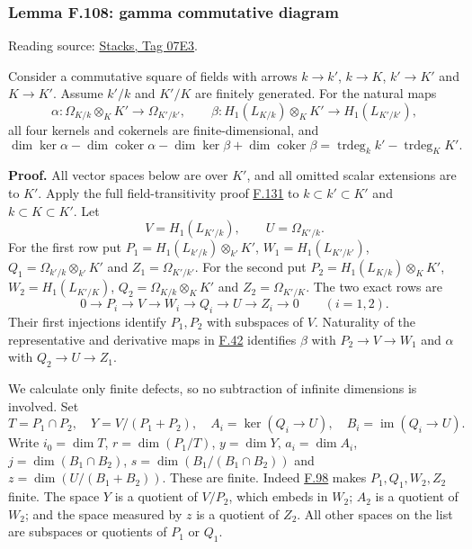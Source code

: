 \documentclass[11pt,a4paper,openany]{report}
\begin{document}
\label{AG-RG-S05-more-algebra-lemma-gamma-commutative-diagram}

\subsubsection{Lemma F.108: gamma commutative diagram}\label{AG-RG-S05-lemma-f.108-gamma-commutative-diagram}

Reading source: \href{https://stacks.math.columbia.edu/tag/07E3}{Stacks, Tag 07E3}.

Consider a commutative square of fields with arrows \(k\to k'\), \(k\to K\), \(k'\to K'\) and \(K\to K'\). Assume \(k'/k\) and \(K'/K\) are finitely generated. For the natural maps \[
\alpha:\Omega_{K/k}\otimes_KK'\longrightarrow\Omega_{K'/k'},
\qquad
\beta:H_1(L_{K/k})\otimes_KK'\longrightarrow H_1(L_{K'/k'}),
\] all four kernels and cokernels are finite-dimensional, and \[
\dim\ker\alpha-\dim\operatorname{coker}\alpha
-\dim\ker\beta+\dim\operatorname{coker}\beta
=\operatorname{trdeg}_k k'-\operatorname{trdeg}_K K'.
\]

\textbf{Proof.} All vector spaces below are over \(K'\), and all omitted scalar extensions are to \(K'\). Apply the full field-transitivity proof \hyperref[AG-RG-S05-more-algebra-lemma-transitivity-gamma]{F.131} to \(k\subset k'\subset K'\) and \(k\subset K\subset K'\). Let \[
V=H_1(L_{K'/k}),\qquad U=\Omega_{K'/k}.
\] For the first row put \(P_1=H_1(L_{k'/k})\otimes_{k'}K'\), \(W_1=H_1(L_{K'/k'})\), \(Q_1=\Omega_{k'/k}\otimes_{k'}K'\) and \(Z_1=\Omega_{K'/k'}\). For the second put \(P_2=H_1(L_{K/k})\otimes_KK'\), \(W_2=H_1(L_{K'/K})\), \(Q_2=\Omega_{K/k}\otimes_KK'\) and \(Z_2=\Omega_{K'/K}\). The two exact rows are \[
0\longrightarrow P_i\longrightarrow V\longrightarrow W_i
\longrightarrow Q_i\longrightarrow U\longrightarrow Z_i\longrightarrow0
\qquad(i=1,2).
\] Their first injections identify \(P_1,P_2\) with subspaces of \(V\). Naturality of the representative and derivative maps in \hyperref[AG-RG-S05-algebra-lemma-exact-sequence-NL]{F.42} identifies \(\beta\) with \(P_2\to V\to W_1\) and \(\alpha\) with \(Q_2\to U\to Z_1\).

We calculate only finite defects, so no subtraction of infinite dimensions is involved. Set \[
T=P_1\cap P_2,\quad Y=V/(P_1+P_2),\quad
A_i=\ker(Q_i\to U),\quad B_i=\operatorname{im}(Q_i\to U).
\] Write \(i_0=\dim T\), \(r=\dim(P_1/T)\), \(y=\dim Y\), \(a_i=\dim A_i\), \(j=\dim(B_1\cap B_2)\), \(s=\dim(B_1/(B_1\cap B_2))\) and \(z=\dim(U/(B_1+B_2))\). These are finite. Indeed \hyperref[AG-RG-S05-more-algebra-lemma-cartier-equality]{F.98} makes \(P_1,Q_1,W_2,Z_2\) finite. The space \(Y\) is a quotient of \(V/P_2\), which embeds in \(W_2\); \(A_2\) is a quotient of \(W_2\); and the space measured by \(z\) is a quotient of \(Z_2\). All other spaces on the list are subspaces or quotients of \(P_1\) or \(Q_1\).
\end{document}
